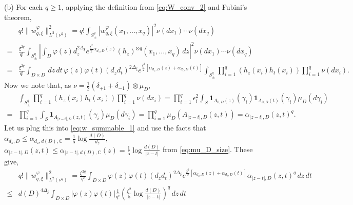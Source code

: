 \documentclass[a4paper, 11pt, reqno]{amsart}
\theoremstyle{definition} \newtheorem{defn}{Definition}[section]
\theoremstyle{remark} \newtheorem{rem}[defn]{Remark}
\theoremstyle{remark} \newtheorem*{rem*}{Remark}
\theoremstyle{plain} \newtheorem{thm}[defn]{Theorem}
\theoremstyle{plain} \newtheorem{lem}[defn]{Lemma}
\theoremstyle{plain} \newtheorem{prop}[defn]{Proposition}
\theoremstyle{plain} \newtheorem{cor}[defn]{Corollary}
\theoremstyle{remark} \newtheorem{exm}[defn]{\textbf{Example}}
\theoremstyle{remark} \newtheorem{exms}[defn]{\textbf{Examples}}
\theoremstyle{remark} \newtheorem*{bl}{}
\numberwithin{equation}{section} %
\newcommand{\x}{\times}
\newcommand{\C}{\mathbb{C}}
\newcommand{\ind}{\mathbf{1}}
\begin{document}
		
		(b) For each $q\ge 1$, applying the definition from \eqref{eq:W_conv_2} and Fubini's theorem,
		\begin{align}\label{eq:w_summable_1}
			& q! \lVert w^{\varphi}_{q, \xi} \rVert_{L^2(\nu^q)}^2 =   q! \int_{S_{\pm}^q} |w^{\varphi}_{q, \xi}(x_1, \ldots, x_q)|^2 \nu(dx_1)\cdots \nu(dx_q)
			\nonumber \\
			= & \frac{\xi^{2q}}{q!} \int_{S_{\pm}^q } \left| \int_D \varphi(z)d_z^{2\Delta_{\xi} } e^{\frac{\xi^2}{2} \alpha_{d_z, D}(z) }   (h_z)^{\otimes q} (x_1, \ldots, x_q) \, dz \right|^2 \nu(dx_1)\cdots \nu(dx_q)
			\nonumber \\
			= & \frac{\xi^{2q}}{q!} \int_{D\x D} \, dz \, dt  \, \varphi(z) \varphi(t) (d_z d_t)^{2\Delta_{\xi} }  e^{\frac{\xi^2}{2} [\alpha_{d_z, D}(z) + \alpha_{d_t, D}(t)] }
            \int_{S_{\pm}^q}  \prod_{i=1}^q(h_z(x_i) h_t(x_i)) \prod_{i=1}^q\nu(dx_i).  
		\end{align}
		Now we note that, as $\nu = \frac{1}{2}(\delta_{+1} + \delta_{-1}) \otimes \mu_D$,
		\begin{align}\label{eq:w_summable_2}
			&\int_{S_{\pm}^q}  \prod_{i=1}^q(h_z(x_i) h_t(x_i)) \prod_{i=1}^q\nu(dx_i) 
			=   \prod_{i=1}^q \epsilon_i^2 \int_{S} \ind_{A_{0, D}(z)} (\gamma_i) \ind_{A_{0, D}(t)} (\gamma_i) \mu_D(d\gamma_i)
			\nonumber \\
			= & \prod_{i=1}^q \int_{S} \ind_{A_{|z-t|, D}(z, t)} (\gamma_i)  \mu_D(d\gamma_i)
			=  \prod_{i=1}^q  \mu_D (A_{|z-t|,D}(z, t)) = \alpha_{|z-t|,D} (z,t)^q.
		\end{align}
		Let us plug this into \eqref{eq:w_summable_1} and use the facts that $\alpha_{d_z, D} \le \alpha_{d_z, d(D), \C} = \frac{1}{5} \log \frac{d(D)}{d_z}$, $\alpha_{|z-t|, D}(z,t) \le \alpha_{|z-t|, d(D), \C}(z) = \frac{1}{5} \log \frac{d(D)}{|z-t|}$ from \eqref{eq:mu_D_size}. These give,
		\begin{align}\label{eq:w_summable_3}
			& q! \lVert w^{\varphi}_{q, \xi} \rVert_{L^2(\nu^q)}^2 =  \frac{\xi^{2q}}{q!} \int_{D\x D} \varphi(z) \varphi(t) (d_z d_t)^{2\Delta_{\xi} }  e^{\frac{\xi^2}{2} [\alpha_{d_z, D}(z) + \alpha_{d_t, D}(t)] } \alpha_{|z-t|,D} (z,t)^q \, dz \, dt
			\nonumber \\
			\le & d(D)^{4\Delta_{\xi}} \int_{D\x D}  |\varphi(z) \varphi(t)|  \frac{1}{q!}\left( \frac{\xi^2}{5}\log\frac{d(D)}{|z-t|}\right)^q  \, dz \, dt
		\end{align}
\end{document}
